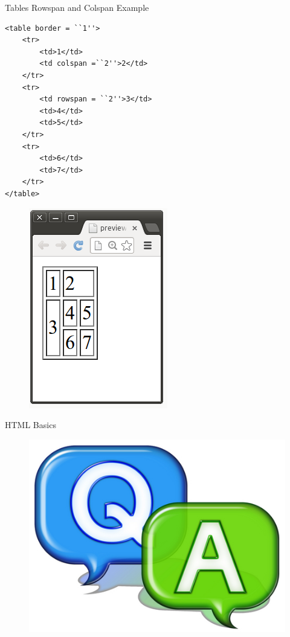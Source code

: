 \documentclass[14pt]{beamer}
\begin{document}
\begin{frame}[fragile]{Tables}
Rowspan and Colspan Example

\begin{minipage}{7cm}
\begin{lstlisting}
<table border = ``1''>
    <tr>
        <td>1</td>
        <td colspan =``2''>2</td>
    </tr>
    <tr>
        <td rowspan = ``2''>3</td>
        <td>4</td>
        <td>5</td>
    </tr>
    <tr>
        <td>6</td>
        <td>7</td>
    </tr>
</table>
\end{lstlisting}
\end{minipage}
\quad
\begin{minipage}{3cm}
\begin{figure}[H]
 \includegraphics[scale=.4]{tables-rowspan-colspan.png}
\end{figure}
\end{minipage}
\end{frame}

\begin{frame}{HTML Basics}
 \begin{figure}[H]
 \begin{center}
   \includegraphics[scale=.3]{qa.png}   
 \end{center}
  \end{figure}
\end{frame}
\end{document}
